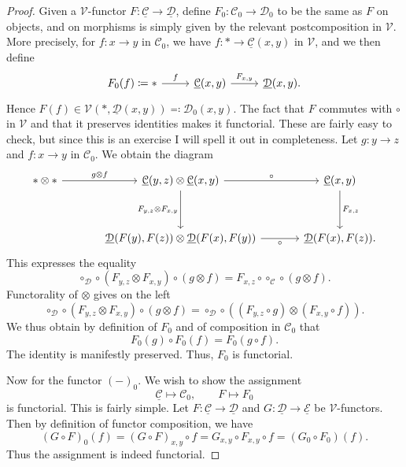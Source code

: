 \begin{proof}
	Given a $\mathcal{V} $-functor $F : \underline{\mathcal{C} }  \to \underline{\mathcal{D} } $, define $F_0: \mathcal{C} _0 \to \mathcal{D} _0$ to be the same as $F$ on objects, and on morphisms is simply given by the relevant postcomposition in $\mathcal{V} $. More precisely, for $f : x \to y$ in $\mathcal{C} _0$, we have $f : * \to \underline{\mathcal{C} } (x,y)$ in $\mathcal{V} $, and we then define
	\[\begin{tikzcd}[row sep = 2.5em, column sep = 2.5em]
	F_0(f)\coloneqq *\ar[" f ", r]  & \underline{\mathcal{C} } (x,y)\ar[" F_{x\text{,} y}  ", r]  & \underline{\mathcal{D} } (x,y).
	\end{tikzcd}\]
	Hence $F(f)\in \mathcal{V} (*,\underline{\mathcal{D} } (x,y))\eqqcolon \mathcal{D} _0(x,y)$. The fact that $F$ commutes with $\circ $ in $\mathcal{V}$ and that it preserves identities makes it functorial. These are fairly easy to check, but since this is an exercise I will spell it out in completeness. Let $g : y \to z$ and $f : x \to y$ in $\mathcal{C} _0$. We obtain the diagram
	\[\begin{tikzcd}[row sep = 3.5em, column sep = 3.5em]
		*\otimes *\ar[" g\otimes f ", r] &\underline{\mathcal{C} } (y,z)\otimes \underline{\mathcal{C} } (x,y)\ar[" \circ  ", r] \ar[" F_{y\text{,} z} \otimes F_{x\text{,} y}  "', d]  & \underline{\mathcal{C} } (x,y)\ar[" F_{x\text{,} z}  ", d]  \\
						 &\underline{\mathcal{D} } (F(y),F(z))\otimes \underline{\mathcal{D} } (F(x),F(y))\ar[" \circ  "', r]  & \underline{\mathcal{D} } (F(x),F(z)) .
	\end{tikzcd}\]
	This expresses the equality
	\[
		\circ_\mathcal{D}  \circ (F_{y,z} \otimes F_{x,y} )\circ (g\otimes f)=F_{x,z} \circ \circ_\mathcal{C}  \circ (g\otimes f)
	.\]
	Functorality of $\otimes $ gives on the left
	\[
		\circ_\mathcal{D}  \circ  (F_{y,z} \otimes F_{x,y} )\circ  (g\otimes f)=\circ_\mathcal{D} \circ ((F_{y,z} \circ g)\otimes (F_{x,y} \circ f))
	.\]
	We thus obtain by definition of $F_0$ and of composition in $\mathcal{C} _0$ that
	\[
		F_0(g)\circ F_0(f)=F_0(g\circ f)
	.\]
	The identity is manifestly preserved. Thus, $F_0$ is functorial.

	Now for the functor $(-)_0$. We wish to show the assignment
	\[
		\underline{\mathcal{C} } \mapsto \mathcal{C} _0,\qquad F\mapsto F_0
	\]
	is functorial. This is fairly simple. Let $F : \underline{\mathcal{C} }  \to \underline{\mathcal{D} } $ and $G : \underline{\mathcal{D} }  \to \underline{\mathcal{E} } $ be $\mathcal{V} $-functors. Then by definition of functor composition, we have
	\[
		(G\circ F)_0(f)=(G\circ F)_{x,y} \circ f = G_{x,y} \circ F_{x,y} \circ f=(G_0\circ F_0)(f)
	.\]
	Thus the assignment is indeed functorial.
\end{proof}

